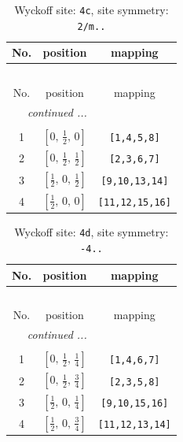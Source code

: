\documentclass[fleqn,8pt]{jsarticle}
\begin{document}
\renewcommand{\arraystretch}{1.2}
\begin{longtable}{ccc}
\caption{Wyckoff site: {\tt 4c}, site symmetry: {\tt 2/m..}}
 \\
 \hline \hline
No. & position & mapping \\ \hline \endfirsthead

\multicolumn{2}{l}{\tablename\ \thetable{}} \\
 \hline \hline
No. & position & mapping \\ \hline \endhead

 \hline \hline
\multicolumn{2}{r}{\footnotesize\it continued ...} \\ \endfoot

 \hline \hline
\multicolumn{2}{r}{} \\ \endlastfoot

1 & $\left[ 0,\, \frac{1}{2},\, 0 \right]$ & {\tt [1,4,5,8]} \\ \hline
2 & $\left[ 0,\, \frac{1}{2},\, \frac{1}{2} \right]$ & {\tt [2,3,6,7]} \\ \hline
3 & $\left[ \frac{1}{2},\, 0,\, \frac{1}{2} \right]$ & {\tt [9,10,13,14]} \\ \hline
4 & $\left[ \frac{1}{2},\, 0,\, 0 \right]$ & {\tt [11,12,15,16]} \\
\end{longtable}
\renewcommand{\arraystretch}{1.2}
\begin{longtable}{ccc}
\caption{Wyckoff site: {\tt 4d}, site symmetry: {\tt -4..}}
 \\
 \hline \hline
No. & position & mapping \\ \hline \endfirsthead

\multicolumn{2}{l}{\tablename\ \thetable{}} \\
 \hline \hline
No. & position & mapping \\ \hline \endhead

 \hline \hline
\multicolumn{2}{r}{\footnotesize\it continued ...} \\ \endfoot

 \hline \hline
\multicolumn{2}{r}{} \\ \endlastfoot

1 & $\left[ 0,\, \frac{1}{2},\, \frac{1}{4} \right]$ & {\tt [1,4,6,7]} \\ \hline
2 & $\left[ 0,\, \frac{1}{2},\, \frac{3}{4} \right]$ & {\tt [2,3,5,8]} \\ \hline
3 & $\left[ \frac{1}{2},\, 0,\, \frac{1}{4} \right]$ & {\tt [9,10,15,16]} \\ \hline
4 & $\left[ \frac{1}{2},\, 0,\, \frac{3}{4} \right]$ & {\tt [11,12,13,14]} \\
\end{longtable}
\end{document}
